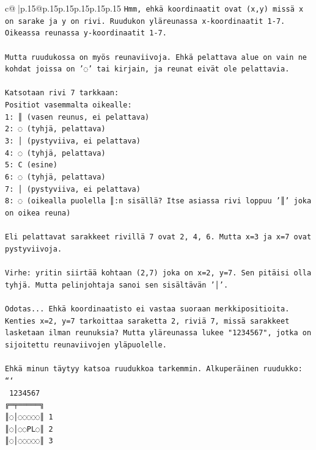 \documentclass{article}
\begin{document}
{\begin{supertabular}{c@{$\;$}|p{.15\linewidth}@{}p{.15\linewidth}p{.15\linewidth}p{.15\linewidth}p{.15\linewidth}p{.15\linewidth}}
{{{\texttt{Hmm, ehkä koordinaatit ovat (x,y) missä x on sarake ja y on rivi. Ruudukon yläreunassa x{-}koordinaatit 1{-}7. Oikeassa reunassa y{-}koordinaatit 1{-}7.} \\
\\ 
\texttt{Mutta ruudukossa on myös reunaviivoja. Ehkä pelattava alue on vain ne kohdat joissa on '◌' tai kirjain, ja reunat eivät ole pelattavia.} \\
\\ 
\texttt{Katsotaan rivi 7 tarkkaan:} \\
\texttt{Positiot vasemmalta oikealle:} \\
\texttt{1: ║ (vasen reunus, ei pelattava)} \\
\texttt{2: ◌ (tyhjä, pelattava)} \\
\texttt{3: │ (pystyviiva, ei pelattava)} \\
\texttt{4: ◌ (tyhjä, pelattava)} \\
\texttt{5: C (esine)} \\
\texttt{6: ◌ (tyhjä, pelattava)} \\
\texttt{7: │ (pystyviiva, ei pelattava)} \\
\texttt{8: ◌ (oikealla puolella ║:n sisällä? Itse asiassa rivi loppuu '║' joka on oikea reuna)} \\
\\ 
\texttt{Eli pelattavat sarakkeet rivillä 7 ovat 2, 4, 6. Mutta x=3 ja x=7 ovat pystyviivoja.} \\
\\ 
\texttt{Virhe: yritin siirtää kohtaan (2,7) joka on x=2, y=7. Sen pitäisi olla tyhjä. Mutta pelinjohtaja sanoi sen sisältävän '│'.} \\
\\ 
\texttt{Odotas... Ehkä koordinaatisto ei vastaa suoraan merkkipositioita. Kenties x=2, y=7 tarkoittaa saraketta 2, riviä 7, missä sarakkeet lasketaan ilman reunuksia? Mutta yläreunassa lukee "1234567", jotka on sijoitettu reunaviivojen yläpuolelle.} \\
\\ 
\texttt{Ehkä minun täytyy katsoa ruudukkoa tarkemmin. Alkuperäinen ruudukko:} \\
\texttt{```} \\
\texttt{ 1234567} \\
\texttt{╔═╤═════╗} \\
\texttt{║◌│◌◌◌◌◌║ 1} \\
\texttt{║◌│◌◌PL◌║ 2} \\
\texttt{║◌│◌◌◌◌◌║ 3} \\
}}}
\end{supertabular}}
\end{document}
